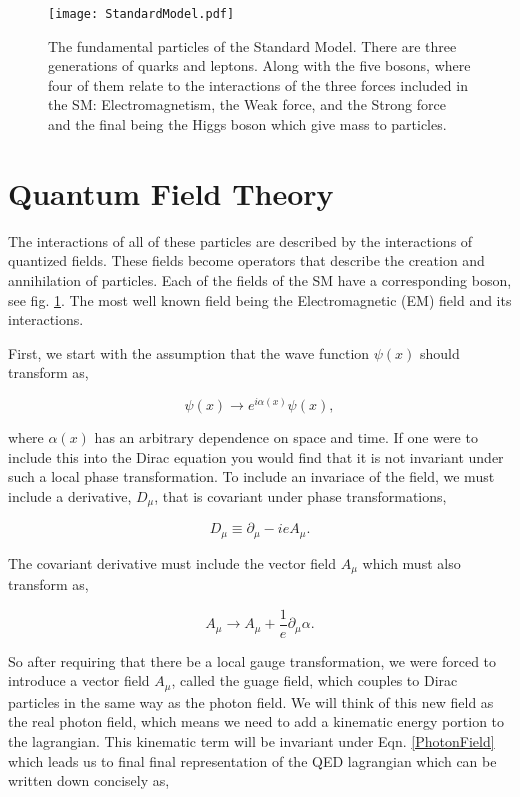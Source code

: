 \begin{figure}
 	\centering
	\texttt{[image: StandardModel.pdf]}
 	\caption{The fundamental particles of the Standard Model. There are three generations of quarks and leptons. Along with the five bosons, where four of them relate to the interactions of the three forces included in the SM: Electromagnetism, the Weak force, and the Strong force and the final being the Higgs boson which give mass to particles. }
 	\label{SMParticles} 
\end{figure}
 
 \section{Quantum Field Theory}
 \label{QFT}
 
 The interactions of all of these particles are described by the interactions of quantized fields. These fields become operators that describe the creation and annihilation of particles. Each of the fields of the SM have a corresponding boson, see fig. \ref{SMParticles}. The most well known field being the Electromagnetic (EM) field and its interactions. 
 
 First, we start with the assumption that the wave function $\psi(x)$ should transform as,
 
 \begin{equation}\label{U1gauge}
 \psi(x)\rightarrow e^{i\alpha(x)}\psi(x),
 \end{equation}
 
 where $\alpha(x)$ has an arbitrary dependence on space and time. If one were to include this into the Dirac equation you would find that it is not invariant under such a local phase transformation. To include an invariace of the field, we must include a derivative, $D_\mu$, that is covariant under phase transformations,
 
 \begin{equation}\label{QEDCovariantD}
 D_\mu\equiv\partial_\mu-ieA_\mu.
 \end{equation}
 
 The covariant derivative must include the vector field $A_\mu$ which must also transform as,
  
 \begin{equation}\label{PhotonField}
 A_\mu\rightarrow A_\mu+\frac{1}{e}\partial_\mu\alpha.
 \end{equation}
 
 So after requiring that there be a local gauge transformation, we were forced to introduce a vector field $A_\mu$, called the guage field, which couples to Dirac particles in the same way as the photon field. We will think of this new field as the real photon field, which means we need to add a kinematic energy portion to the lagrangian. This kinematic term will be invariant under Eqn. \ref{PhotonField} which leads us to final final representation of the QED lagrangian which can be written down concisely as, 
 
